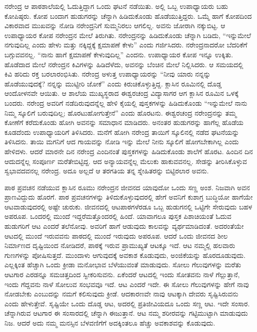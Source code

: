 ನರೇಂದ್ರ ಆ ಪಾಠಶಾಲೆಯಲ್ಲಿ ಓದುತ್ತಿದ್ದಾಗ ಒಂದು ಘಟನೆ ನಡೆಯಿತು. ಅಲ್ಲಿ ಒಬ್ಬ ಉಪಾಧ್ಯಾಯರು ಬಹು ಕೋಪಿಷ್ಠರು. ಕೋಪ ಬಂದಾಗ ಹುಡುಗರನ್ನು ಚೆನ್ನಾಗಿ ಹಿಡಿದುಕೊಂಡು ಹೊಡೆಯುತ್ತಿದ್ದರು. ಒಮ್ಮೆ ಹಾಗೆ ಕೋಪದಿಂದ ವಿಕಾರವಾದ ಮುಖವನ್ನು ನೋಡಿ ನರೇಂದ್ರನಿಗೆ ಸುಮ್ಮನಿರಲು ಆಗಲಿಲ್ಲ. ಅವನು ಜೋರಾಗಿ ನಕ್ಕುಬಿಟ್ಟ. ಆ ಉಪಾಧ್ಯಾಯರ ಕೋಪ ನರೇಂದ್ರನ ಮೇಲೆ ತಿರುಗಿತು. ನರೇಂದ್ರನನ್ನು ಹಿಡಿದುಕೊಂಡು ಚೆನ್ನಾಗಿ ಬಡಿದು, “ಇನ್ನುಮೇಲೆ ನಗುವುದಿಲ್ಲ ಎಂದು ಹೇಳು ಮತ್ತು ನಕ್ಕಿದ್ದಕ್ಕೆ ಕ್ಷಮಾಪಣೆ ಕೇಳು” ಎಂದು ಗರ್ಜಿಸಿದರು. ನರೇಂದ್ರನಾದರೋ ಬೆದರಿಕೆಗೆ ಬಗ್ಗುವವನಲ್ಲ. “ನಾನು ಹಾಗೆ ಕ್ಷಮಾಪಣೆ ಕೇಳುವುದಿಲ್ಲ” ಎಂದನು. ಉಪಾಧ್ಯಾಯರ ಕೋಪ ಇನ್ನೂ ಉಕ್ಕಿತು. ಹೊಡೆದಾದ ಮೇಲೆ ನರೇಂದ್ರನ ಕಿವಿಗಳನ್ನು ಹಿಡಿದೆಳೆದು, ಅವನನ್ನು ಬೆಂಚಿನ ಮೇಲೆ ನಿಲ್ಲಿಸಿದರು. ಆ ಸಮಯದಲ್ಲಿ ಕಿವಿ ಹರಿದು ರಕ್ತ ಬರಲಾರಂಭಿಸಿತು. ನರೇಂದ್ರ ಅಳುತ್ತ ಉಪಾಧ್ಯಾಯರನ್ನು “ನೀವು ಯಾರು ನನ್ನನ್ನು ಹೊಡೆಯುವುದಕ್ಕೆ? ನನ್ನನ್ನು ಮುಟ್ಟೀರಿ ಜೋಕೆ” ಎಂದು ಕಿರುಚಿಕೊಳ್ಳುತ್ತಿದ್ದ. ಕ್ಲಾಸಿನ ರೂಮಿನಲ್ಲಿ ದೊಡ್ಡ ಆಂದೋಳನವೇ ಆಯಿತು. ಆ ಶಾಲೆಯ ಮುಖ್ಯಸ್ಥರಾದ ಈಶ್ವರಚಂದ್ರ ವಿದ್ಯಾಸಾಗರ ಆಗ ಕ್ಲಾಸಿನ ರೂಮಿನ ಒಳಕ್ಕೆ ಬಂದರು. ನರೇಂದ್ರ ಅವರಿಗೆ ನಡೆದಿರುವುದನ್ನೆಲ್ಲ ಹೇಳಿ ಕೈಯಲ್ಲಿ ಪುಸ್ತಕಗಳನ್ನು ಹಿಡಿದುಕೊಂಡು “ಇನ್ನುಮೇಲೆ ನಾನು ನಿಮ್ಮ ಸ್ಕೂಲಿಗೆ ಬರುವುದಿಲ್ಲ; ಹೊರಟುಹೋಗುತ್ತೇನೆ” ಎಂದು ಹೊರಟನು. ಈಶ್ವರಚಂದ್ರ ನರೇಂದ್ರನನ್ನು ತಮ್ಮ ಕೋಣೆಗೆ ಕರೆದುಕೊಂಡು ಹೋಗಿ ಅವನನ್ನು ಸಮಾಧಾನ ಮಾಡಿದರು. ಅನಂತರ ಹುಡುಗರನ್ನು ಹಾಗೆಲ್ಲ ಹೊಡೆಯ ಕೂಡದೆಂದು ಉಪಾಧ್ಯಾಯರಿಗೆ ತಿಳಿಸಿದರು. ಮನೆಗೆ ಹೋಗಿ ನರೇಂದ್ರ ತಾಯಿಗೆ ಸ್ಕೂಲಿನಲ್ಲಿ ನಡೆದ ಘಟನೆಯನ್ನು ತಿಳಿಸಿದನು. ತಾಯಿ ಮಗನಿಗೆ ಆದ ಗಾಯವನ್ನು ನೋಡಿ ಇನ್ನು ಮೇಲೆ ನೀನು ಸ್ಕೂಲಿಗೆ ಹೋಗಬೇಕಾಗಿಲ್ಲ ಎಂದು ಹೇಳಿದಳು. ಆದರೆ ಮಾರನೇ ದಿನ ನರೇಂದ್ರ ಎಂದಿನಂತೆ ಪುಸ್ತಕಗಳನ್ನು ಹಿಡಿದುಕೊಂಡು ಶಾಲೆಗೆ ಹೊರಟ. ಹಿಂದಿನ ದಿನ ಆದುದನ್ನೆಲ್ಲ ಸಂಪೂರ್ಣ ಮರೆತೇಬಿಟ್ಟಿದ್ದ. ಆದ ಅನ್ಯಾಯವನ್ನೆಲ್ಲ ಮೆಲುಕು ಹಾಕುವವನಲ್ಲ. ಸೇಡನ್ನು ತೀರಿಸಿಕೊಳ್ಳುವ ಸ್ವಭಾವದವನಲ್ಲ ನರೇಂದ್ರ. ಅದೂ ಅಲ್ಲದೆ ಆ ತರಗತಿಯ ತನ್ನ ಸ್ನೇಹಿತರನ್ನು ಬಿಟ್ಟಿರಲಾರ ಅವನು.

ಪಾಠ ಪ್ರವಚನ ನಡೆಯುವ ಕ್ಲಾಸಿನ ರೂಮು ನರೇಂದ್ರನ ಜೀವನದ ಯಾವುದೋ ಒಂದು ಸಣ್ಣ ಅಂಶ. ನಿಜವಾಗಿ ಅವನ ಪ್ರಾಣವಿದ್ದುದು ಹೊರಗೆ. ಪಾಠ ಪ್ರವಚನಗಳನ್ನು ತಿಳಿದುಕೊಳ್ಳುವುದರಲ್ಲಿ ಹೇಗೆ ಅವನಿಗೆ ಕುಶಾಗ್ರ ಬುದ್ಧಿಯೋ ಹಾಗೆಯೇ ಆಟವಾಡುವುದರಲ್ಲಿ ಅಷ್ಟೇ ಚುರುಕು. ಜೀವನದಲ್ಲಿ ಆಟಪಾಠಗಳೆರಡೂ ಒಬ್ಬ ಹುಡುಗನಲ್ಲಿ ಒಟ್ಟಿಗೇ ಸೇರುವುದು ಬಹಳ ಅಪರೂಪ. ಒಂದರಲ್ಲಿ ಮುಂದೆ ಇದ್ದರೆ\break ಮತ್ತೊಂದರಲ್ಲಿ ಹಿಂದೆ. ಯಾವಾಗಲೂ ಪುಸ್ತಕ ಪಿಶಾಚಿಯಂತೆ ಓದುವ ಹುಡುಗರಿಗೆ ಆಟ ಎಂದರೆ ತಲೆನೋವು. ಅವರಿಗೆ ಹಾಗೆ ಆಡುವುದು ಕಾಲವನ್ನು ವ್ಯರ್ಥಮಾಡಿದಂತೆ. ಅದರಂತೆಯೇ ಆಟದಲ್ಲಿ ಮುಂದೆ ಇರುವವನು ಪಾಠದಲ್ಲಿ ಮುಂದೆ ಇರುವುದು ಅಪರೂಪ. ಆದರೆ ಒಂದು ಜೀವನದ ಶೀಲ ನಿರ್ಮಾಣದ ದೃಷ್ಟಿಯಿಂದ ನೋಡಿದರೆ, ಪಾಠಕ್ಕೆ ಇರುವ ಪ್ರಾಮುಖ್ಯತೆ ಆಟಕ್ಕೂ ಇದೆ. ಆಟ ನಮ್ಮಲ್ಲಿ ಹಲವಾರು ಗುಣಗಳನ್ನು ಪೋಷಿಸುತ್ತದೆ. ಮುಂದಾಳು ಆಗುವುದಕ್ಕೆ ಅವಕಾಶ ಕೊಡುವುದು, ಅಂಜಿಕೆಯನ್ನು ಹೊರದೂಡುವುದು. ಎಲ್ಲಕ್ಕಿಂತ ಹೆಚ್ಚಾಗಿ ಒಂದು ಕ್ರೀಡಾ ಮನೋಭಾವ ಬೆಳೆಯುವಂತೆ ಮಾಡುವುದು. ಸೋಲು ಗೆಲುವುಗಳನ್ನು ಮರೆತು ಆಟಗಾರ ಎರಡನ್ನೂ ಸಮಚಿತ್ತದಿಂದ ಸ್ವೀಕರಿಸುವನು. ಏಕೆಂದರೆ ಆಟದಲ್ಲಿ ಇಂದು ಸೋತವನು ನಾಳೆ ಗೆಲ್ಲುತ್ತಾನೆ, ಇಂದು ಗೆದ್ದವನು ನಾಳೆ ಸೋಲುವ ಸಂಭವವೂ ಇದೆ. ಆಟ ಎಂದರೆ ಇದೇ. ಈ ಸೋಲು ಗೆಲುವುಗಳನ್ನು ಹೇಗೆ ನಾವು ನೋಡಬೇಕು ಎಂಬುದನ್ನು ನಮಗೆ ಕಲಿಸುವುದು ಕ್ರೀಡೆ. ಆದಕಾರಣವೇ ನಾವು ಆಟಕ್ಕಾಗಿ ದೇವರು ಸೃಷ್ಟಿಸಿರುವನು ಎಂದು ಹೇಳುತ್ತೇವೆ. ಸೃಷ್ಟಿಯೇ ಒಂದು ದೊಡ್ಡ ಆಟ, ಅದರಲ್ಲಿ ಪ್ರತಿಜೀವಿಯದೂ ಒಂದು ಸಣ್ಣ ಆಟ. ಇದೇ ಸಂಸಾರ. ಚೆನ್ನಾಗಿರುವ ಆಟಗಾರ ಈ ಸಂಸಾರದಲ್ಲಿ ಚೆನ್ನಾಗಿ ಈಜುತ್ತಾನೆ. ಆಟ ನಮ್ಮ ಶರೀರವನ್ನು ಗಟ್ಟಿಮುಟ್ಟಾಗಿ ಮಾಡುವುದು ನಿಜ. ಆದರೆ ಅದು ನಮ್ಮ ಮನಸ್ಸಿನ ಬೆಳವಣಿಗೆಗೆ ಅದಕ್ಕಿಂತಲೂ ಹೆಚ್ಚು ಅವಕಾಶವನ್ನು ಕೊಡುವುದು.

